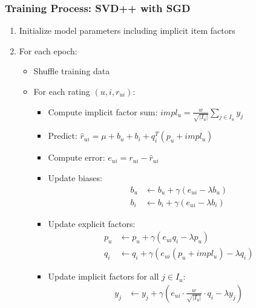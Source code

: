 \documentclass{beamer}
\begin{document}
\begin{frame}
\frametitle{Training Process: SVD++ with SGD}
\begin{enumerate}
    \item Initialize model parameters including implicit item factors
    \item For each epoch:
    \begin{itemize}
        \item Shuffle training data
        \item For each rating $(u,i,r_{ui})$:
        \begin{itemize}
            \item Compute implicit factor sum: $impl_u = \frac{w}{\sqrt{|I_u|}} \sum_{j \in I_u} y_j$
            \item Predict: $\hat{r}_{ui} = \mu + b_u + b_i + q_i^T(p_u + impl_u)$
            \item Compute error: $e_{ui} = r_{ui} - \hat{r}_{ui}$
            \item Update biases:
            \begin{align*}
            b_u &\leftarrow b_u + \gamma(e_{ui} - \lambda b_u)\\
            b_i &\leftarrow b_i + \gamma(e_{ui} - \lambda b_i)
            \end{align*}
            \item Update explicit factors:
            \begin{align*}
            p_u &\leftarrow p_u + \gamma(e_{ui}q_i - \lambda p_u)\\
            q_i &\leftarrow q_i + \gamma(e_{ui}(p_u + impl_u) - \lambda q_i)
            \end{align*}
            \item Update implicit factors for all $j \in I_u$:
            \begin{align*}
            y_j &\leftarrow y_j + \gamma(e_{ui} \cdot \frac{w}{\sqrt{|I_u|}} \cdot q_i - \lambda y_j)
            \end{align*}
        \end{itemize}
    \end{itemize}
\end{enumerate}
\end{frame}
\end{document}
